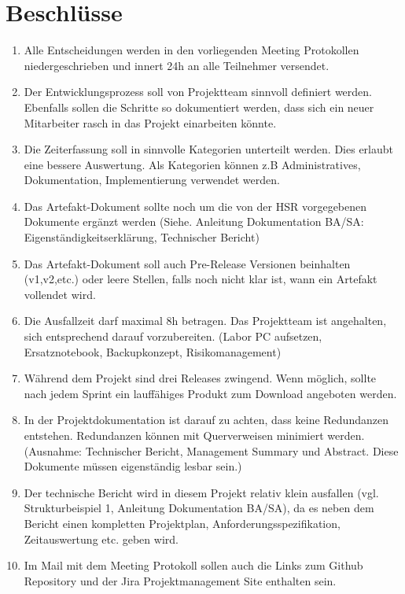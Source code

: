 \documentclass[11pt, a4paper,oneside]{scrartcl}
\begin{document}
\section{Beschlüsse}
\begin{enumerate}
	\item Alle Entscheidungen werden in den vorliegenden Meeting Protokollen niedergeschrieben und innert 24h an alle Teilnehmer versendet.
	\item Der Entwicklungsprozess soll von Projektteam sinnvoll definiert werden. Ebenfalls sollen die Schritte so dokumentiert werden, dass sich ein neuer Mitarbeiter rasch in das Projekt einarbeiten könnte.
	\item Die Zeiterfassung soll in sinnvolle Kategorien unterteilt werden. Dies erlaubt eine bessere Auswertung. Als Kategorien können z.B Administratives, Dokumentation, Implementierung verwendet werden.
	\item Das Artefakt-Dokument sollte noch um die von der HSR vorgegebenen Dokumente ergänzt werden (Siehe. Anleitung Dokumentation BA/SA: Eigenständigkeitserklärung, Technischer Bericht)
	\item Das Artefakt-Dokument soll auch Pre-Release Versionen beinhalten (v1,v2,etc.) oder leere Stellen, falls noch nicht klar ist, wann ein Artefakt vollendet wird.
	\item Die Ausfallzeit darf maximal 8h betragen. Das Projektteam ist angehalten, sich entsprechend darauf vorzubereiten. (Labor PC aufsetzen, Ersatznotebook, Backupkonzept, Risikomanagement)
	\item Während dem Projekt sind drei Releases zwingend. Wenn möglich, sollte nach jedem Sprint ein lauffähiges Produkt zum Download angeboten werden. 
	\item In der Projektdokumentation ist darauf zu achten, dass keine Redundanzen entstehen. Redundanzen können mit Querverweisen minimiert werden. (Ausnahme: Technischer Bericht, Management Summary und Abstract. Diese Dokumente müssen eigenständig lesbar sein.)
	\item Der technische Bericht wird in diesem Projekt relativ klein ausfallen (vgl. Strukturbeispiel 1, Anleitung Dokumentation BA/SA), da es neben dem Bericht einen kompletten Projektplan, Anforderungsspezifikation, Zeitauswertung etc. geben wird.
	\item Im Mail mit dem Meeting Protokoll sollen auch die Links zum Github Repository und der Jira Projektmanagement Site enthalten sein.
\end{enumerate}
\end{document}
